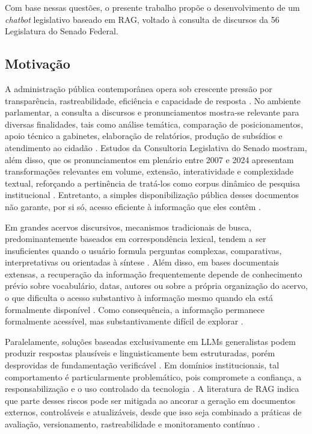 Com base nessas questões, o presente trabalho propõe o desenvolvimento de um \textit{chatbot} legislativo baseado em RAG, voltado à consulta de discursos da 56\textordfeminine{} Legislatura do Senado Federal.

\subsection{Motivação}

A administração pública contemporânea opera sob crescente pressão por transparência, rastreabilidade, eficiência e capacidade de resposta \parencite{un2015responsiveGovernance}. No ambiente parlamentar, a consulta a discursos e pronunciamentos mostra-se relevante para diversas finalidades, tais como análise temática, comparação de posicionamentos, apoio técnico a gabinetes, elaboração de relatórios, produção de subsídios e atendimento ao cidadão \parencite{skubicFiser2024discourseReview}. Estudos da Consultoria Legislativa do Senado mostram, além disso, que os pronunciamentos em plenário entre 2007 e 2024 apresentam transformações relevantes em volume, extensão, interatividade e complexidade textual, reforçando a pertinência de tratá-los como corpus dinâmico de pesquisa institucional \parencite{blanco2025plenarioPalanqueEstudio,blanco2026letrasGraudas}. Entretanto, a simples disponibilização pública desses documentos não garante, por si só, acesso eficiente à informação que eles contêm \parencite{geunis2023parliamentaryMonitoring}.

Em grandes acervos discursivos, mecanismos tradicionais de busca, predominantemente baseados em correspondência lexical, tendem a ser insuficientes quando o usuário formula perguntas complexas, comparativas, interpretativas ou orientadas à síntese \parencite{gupta2024comprehensiveRag}. Além disso, em bases documentais extensas, a recuperação da informação frequentemente depende de conhecimento prévio sobre vocabulário, datas, autores ou sobre a própria organização do acervo, o que dificulta o acesso substantivo à informação mesmo quando ela está formalmente disponível \parencite{bandeiraBernardes2016information,geunis2023parliamentaryMonitoring}. Como consequência, a informação permanece formalmente acessível, mas substantivamente difícil de explorar \parencite{bandeiraBernardes2016information,geunis2023parliamentaryMonitoring}.

Paralelamente, soluções baseadas exclusivamente em LLMs generalistas podem produzir respostas plausíveis e linguisticamente bem estruturadas, porém desprovidas de fundamentação verificável \parencite{anhHoang2025hallucinations,gao2023ragSurvey}. Em domínios institucionais, tal comportamento é particularmente problemático, pois compromete a confiança, a responsabilização e o uso controlado da tecnologia \parencite{deAlmeidaSantos2025aiGovernance,wfd2023guidelinesAiParliaments}. A literatura de RAG indica que parte desses riscos pode ser mitigada ao ancorar a geração em documentos externos, controláveis e atualizáveis, desde que isso seja combinado a práticas de avaliação, versionamento, rastreabilidade e monitoramento contínuo \parencite{gao2023ragSurvey,saadFalconEtAl2024ares,esEtAl2023ragas}.

